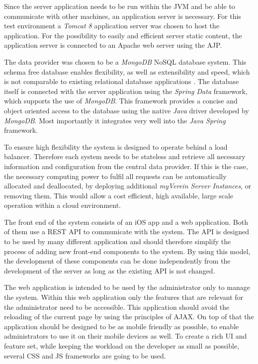 Since the server application needs to be run within the \gls{JVM} and be able to communicate with other machines, an application server is necessary. For this test environment a \emph{Tomcat 8} application server was chosen to host the application. For the possibility to easily and efficient server static content, the application server is connected to an Apache web server using the \gls{AJP}. 

The data provider was chosen to be a \emph{MongoDB} \gls{NoSQL} database system. This schema free database enables flexibility, as well as extensibility and speed, which is not comparable to existing relational database applications \cite{Moschetti:2014aa}. The database itself is connected with the server application using the \emph{Spring Data} framework, which supports the use of \emph{MongoDB}. This framework provides a concise and object oriented access to the database using the native \emph{Java} driver developed by \emph{MongoDB}. Most importantly it integrates very well into the \emph{Java Spring} framework.

To ensure high flexibility the system is designed to operate behind a load balancer. Therefore each system needs to be stateless and retrieve all necessary information and configuration from the central data provider. If this is the case, the necessary computing power to fulfil all requests can be automatically allocated and deallocated, by deploying additional \emph{myVerein Server Instances}, or removing them. This would allow a cost efficient, high available, large scale operation within a cloud environment.  

The front end of the system consists of an iOS app and a web application. Both of them use a \gls{REST} \gls{API} to communicate with the system. The \gls{API} is designed to be used by many different application and should therefore simplify the process of adding new front-end components to the system. By using this model, the development of these components can be done independently from the development of the server as long as the existing \gls{API} is not changed.

The web application is intended to be used by the administrator only to manage the system. Within this web application only the features that are relevant for the administrator need to be accessible. This application should avoid the reloading of the current page by using the principles of \gls{AJAX}. On top of that the application should be designed to be as mobile friendly as possible, to enable administrators to use it on their mobile devices as well. To create a rich \gls{UI} and feature set, while keeping the workload on the developer as small as possible, several \gls{CSS} and \gls{JS} frameworks are going to be used.

